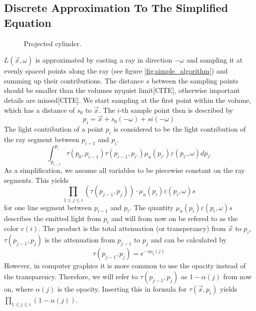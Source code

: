 \subsection{Discrete Approximation To The Simplified Equation}
\begin{figure}
\centering
\def\svgwidth{\columnwidth}


  \caption{\label{fig:projected_cylinder2}
         Projected cylinder.}
\end{figure}
$L(\vec{x},\omega )$ is approximated by casting a ray in direction $-\omega$ and sampling it at evenly spaced points along the ray (see figure \ref{fig:simple_algorithm}) and summing up their contributions\cite{511}. The distance $s$ between the sampling points should be smaller than the volumes nyquist limit[CITE], otherwise important details are missed[CITE].
We start sampling at the first point within the volume, which has a distance of $s_0$ to $\vec{x}$. The $i$-th sample point then is described by
\begin{equation}
p_i=\vec{x} + s_0(-\omega) + si(-\omega)
\end{equation}
The light contribution of a point $p_i$ is considered to be the light contribution of the ray segment between $p_{i-1}$ and $p_i$.
\begin{equation}
\int_{p_{i-1}}^{p_i} \tau (p_0,p_{i-1}) \tau(p_{i-1},p_{i'}) \mu_a(p_{i'})\varepsilon (p_{i'}, \omega)dp_{i'}
\end{equation} 
As a simplification, we assume all variables to be piecewise constant\cite{10.1145/147130.147155} on the ray segments. This yields
\begin{equation}
{\prod_{1\le j \le i}{(\tau(p_{j-1}, p_j))} \cdot \mu_a(p_{i})\varepsilon (p_{i}, \omega)s}
\end{equation} 
for one line segment between $p_{i-1}$ and $p_i$.
The quantity $\mu_a(p_{i})\varepsilon (p_{i}, \omega)s$ describes the emitted light from $p_i$ and will from now on be refered to as the color $c(i)$. The product is the total attenuation (or transperancy) from $\vec{x}$ to $p_i$, $\tau(p_{j-1}, p_j)$ is the attenuation from $p_{j-1}$ to $p_j$ and can be calculated by
\begin{equation}
\tau(p_{j-1}, p_j) = e^{-s\mu_t(j)}
\end{equation}
However, in computer graphics it is more common to use the opacity instead of the transparency. Therefore, we will refer to $\tau(p_{j-1}, p_j)$ as $1 - \alpha(j)$ from now on, where $\alpha(j)$ is the opacity. Inserting this in formula for $\tau(\vec{x}, p_i)$ yields $\prod_{1 \le j \le i} (1 - \alpha(j))$.

